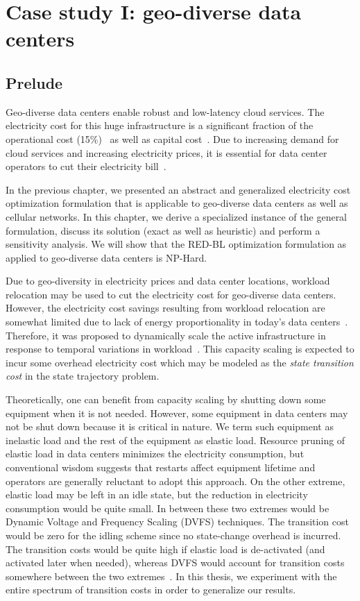 \chapter{Case study I: geo-diverse data centers}
\label{chap:casestudy1}
\section{Prelude}
Geo-diverse data centers enable robust and low-latency cloud services. The electricity cost for this huge infrastructure is a significant fraction of the operational cost (15\%)~\cite{costCloud} as well as capital cost~\cite{qureshiHotnets}. Due to increasing demand for cloud services and increasing electricity prices, it is essential for data center operators to cut their electricity bill~\cite{brill:DataCenterCrisis:UI:2007,Belady_EC_2007}.

In the previous chapter, we presented an abstract and generalized electricity cost optimization formulation that is applicable to geo-diverse data centers as well as cellular networks. In this chapter, we derive a specialized instance of the general formulation, discuss its solution (exact as well as heuristic) and perform a sensitivity analysis.  We will show that the RED-BL optimization formulation as applied to geo-diverse data centers is NP-Hard. 

Due to geo-diversity in electricity prices and data center locations, workload relocation may be used to cut the electricity cost for geo-diverse data centers. However, the electricity cost savings resulting from workload relocation are somewhat limited due to lack of energy proportionality in today's data centers~\cite{10.1109/MC.2007.443}. Therefore, it was proposed to dynamically scale the active infrastructure in response to temporal variations in workload~\cite{10.1109/MC.2007.443,qureshi2009cutting}. This capacity scaling is expected to incur some overhead electricity cost which may be modeled as the \textit{state transition cost} in the state trajectory problem. 

Theoretically, one can benefit from capacity scaling by shutting down some equipment when it is not needed. However, some equipment in data centers may not be shut down because it is critical in nature. We term such equipment as inelastic load and the rest of the equipment as elastic load. Resource pruning of elastic load in data centers minimizes the electricity consumption, but conventional wisdom suggests that restarts affect equipment lifetime and operators are generally reluctant to adopt this approach. On the other extreme, elastic load may be left in an idle state, but the reduction in electricity  consumption would be quite small. In between these two extremes would be Dynamic Voltage and Frequency Scaling (DVFS) techniques. The transition cost would be zero for the idling scheme since no state-change overhead is incurred. The transition costs would be quite high if elastic load is de-activated (and activated later when needed), whereas DVFS would account for transition costs somewhere between the two extremes~\cite{Meisner:2009:PES:1508244.1508269}. In this thesis, we experiment with the entire spectrum of transition costs in order to generalize our results.

